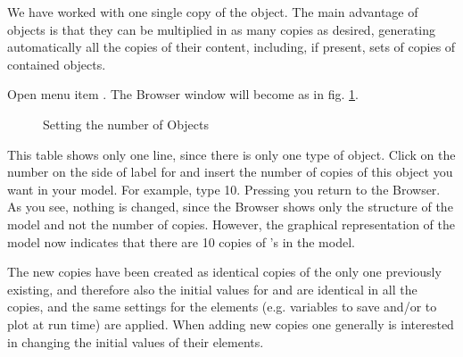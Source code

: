 \documentclass [11pt,a4paper] {book}
\begin{document}
We have worked with one single copy of the  object. The main advantage of objects is that they can be multiplied in as many copies as desired, generating automatically all the copies of their content, including, if present, sets of copies of contained objects.

Open menu item . The Browser
window will become as in fig. \ref{fig:numobject}.

\begin{figure}[ht]
  \centering
  \caption{Setting the number of Objects}
  \label{fig:numobject}
\end{figure}

This table shows only one line, since there is only one type of object. Click on
the number on the side of label for  and insert the number of copies of this
object you want in your model. For example, type 10. Pressing  you return to the
Browser. As you see, nothing is changed, since the Browser shows only the structure of
the model and not the number of copies. However, the graphical representation of the
model now indicates that there are 10 copies of 's in the model.

The new copies have been created as identical copies of the only one previously existing,
and therefore also the initial values for  and  are identical
in all the copies, and the same settings for the elements (e.g. variables to save and/or
to plot at run time) are applied. When adding new copies one generally is interested in changing the initial values of their elements.
\end{document}
